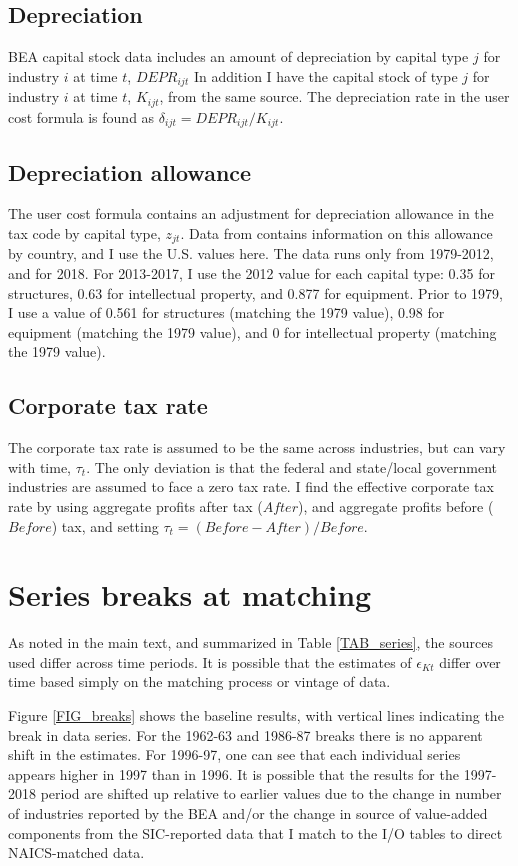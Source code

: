 \documentclass[11pt]{article}
\begin{document}
\subsection{Depreciation}
BEA capital stock data \citep{beacap} includes an amount of depreciation by capital type $j$ for industry $i$ at time $t$, $DEPR_{ijt}$ In addition I have the capital stock of type $j$ for industry $i$ at time $t$, $K_{ijt}$, from the same source. The depreciation rate in the user cost formula is found as $\delta_{ijt} = DEPR_{ijt}/K_{ijt}$.

\subsection{Depreciation allowance}
The user cost formula contains an adjustment for depreciation allowance in the tax code by capital type, $z_{jt}$. Data from \cite{stan} contains information on this allowance by country, and I use the U.S. values here. The data runs only from 1979-2012, and for 2018. For 2013-2017, I use the 2012 value for each capital type: 0.35 for structures, 0.63 for intellectual property, and 0.877 for equipment. Prior to 1979, I use a value of 0.561 for structures (matching the 1979 value), 0.98 for equipment (matching the 1979 value), and 0 for intellectual property (matching the 1979 value). 

\subsection{Corporate tax rate}
The corporate tax rate is assumed to be the same across industries, but can vary with time, $\tau_t$. The only deviation is that the federal and state/local government industries are assumed to face a zero tax rate. I find the effective corporate tax rate by using aggregate profits after tax ($After$), and aggregate profits before ($Before$) tax, and setting $\tau_t = (Before - After)/Before$. 

\section{Series breaks at matching}
As noted in the main text, and summarized in Table \ref{TAB_series}, the sources used differ across time periods. It is possible that the estimates of $\epsilon_{Kt}$ differ over time based simply on the matching process or vintage of data. 

Figure \ref{FIG_breaks} shows the baseline results, with vertical lines indicating the break in data series. For the 1962-63 and 1986-87 breaks there is no apparent shift in the estimates. For 1996-97, one can see that each individual series appears higher in 1997 than in 1996. It is possible that the results for the 1997-2018 period are shifted up relative to earlier values due to the change in number of industries reported by the BEA and/or the change in source of value-added components from the SIC-reported data that I match to the I/O tables to direct NAICS-matched data. 
\end{document}
